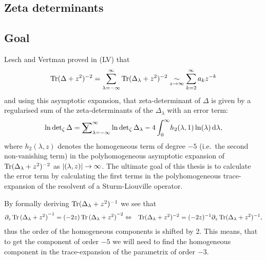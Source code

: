 \subsection{Zeta determinants}
    
\subsection{Goal}
Lesch and Vertman proved in (LV) that
\begin{align}
  \Tr(\Delta + z^2)^{-2} = \sum_{\lambda=-\infty}^\infty \Tr(\Delta_\lambda +
  z^2)^{-2} \SimAs{z\to\infty} \sum_{k=2}^{\infty} a_kz^{-k}
\end{align}
and using this asymptotic expansion, that zeta-determinant of $\Delta$ is given
by a regularised sum of the zeta-determinants of the $\Delta_\lambda$ with an
error term:
\begin{align}
  \ln\operatorname{det}_\zeta \Delta = \Regsum_{\lambda=-\infty}^\infty
  \ln\operatorname{det}_\zeta\Delta_\lambda -
  4\Integ[\infty]{0}{\lambda}{h_2(\lambda, 1)\ln(\lambda)},
\end{align}
where $h_2(\lambda, z)$ denotes the homogeneous term of degree $-5$ (i.e.\ the second
non-vanishing term) in the polyhomogeneous asymptotic expansion of
$\Tr(\Delta_\lambda + z^2)^{-2}$ as $\Abs{(\lambda, z)}\to\infty$. The ultimate
goal of this thesis is to calculate the error term by calculating the
first terms in the polyhomogeneous trace-expansion of the resolvent of a
Sturm-Liouville operator.

By formally deriving $\Tr(\Delta_\lambda + z^2)^{-1}$ we see that
\begin{align*}
  \partial_z \Tr{(\Delta_\lambda + z^2)}^{-1} &=
        (-2z) \Tr{(\Delta_\lambda + z^2)}^{-2}
        \Leftrightarrow& \Tr(\Delta_\lambda + z^2)^{-2} =
        (-2z)^{-1}\partial_z\Tr(\Delta_\lambda + z^2)^{-1},
\end{align*}
thus the order of the homogeneous components is shifted by 2. This means, that
to get the component of order $-5$ we will need to find the homogeneous
component in the trace-expansion of the parametrix of order $-3$.
